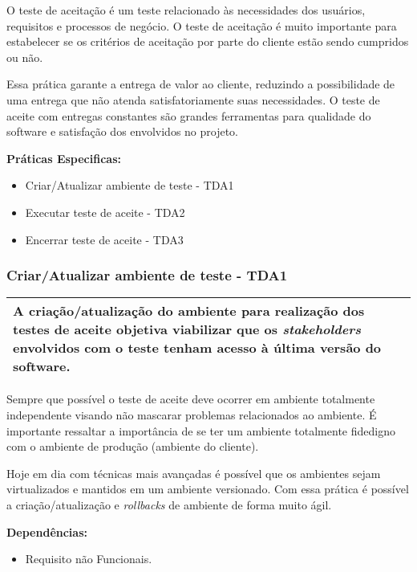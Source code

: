 O teste de aceitação é um teste relacionado às necessidades dos usuários, requisitos e processos de negócio. O teste de aceitação é muito importante para estabelecer se os critérios de aceitação por parte do cliente estão sendo cumpridos ou não.

Essa prática garante a entrega de valor ao cliente, reduzindo a possibilidade de uma entrega que não atenda satisfatoriamente suas necessidades. O teste de aceite com entregas constantes são grandes ferramentas para qualidade do software e satisfação dos envolvidos no projeto.

\textbf{Práticas Especificas:}
\begin{itemize}
    \item  Criar/Atualizar ambiente de teste - TDA1
    \item  Executar teste de aceite - TDA2
    \item  Encerrar teste de aceite - TDA3
\end{itemize}


\subsubsection{Criar/Atualizar ambiente de teste - TDA1}
\label{sec:tda1}

\begin{table}[H]
\centering
\begin{tabular}{|p{130mm}|}
\hline
A criação/atualização do ambiente para realização dos testes de aceite objetiva viabilizar que os \textit{stakeholders} envolvidos com o teste tenham acesso à última versão do software. \\ 
\hline
\end{tabular}
\end{table}

Sempre que possível o teste de aceite deve ocorrer em ambiente totalmente independente visando não mascarar problemas relacionados ao ambiente. É importante ressaltar a importância de se ter um ambiente totalmente fidedigno com o ambiente de produção (ambiente do cliente).

Hoje em dia com técnicas mais avançadas é possível que os ambientes sejam virtualizados e mantidos em um ambiente versionado. Com essa prática é possível a criação/atualização e \textit{rollbacks} de ambiente de forma muito ágil.

\textbf{Dependências: }
\begin{itemize}
    \item  Requisito não Funcionais.
\end{itemize}

